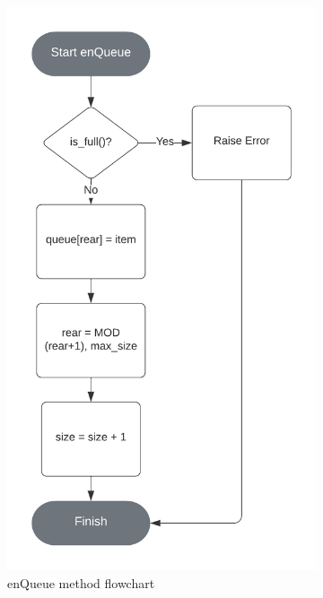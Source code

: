 \documentclass{article}
\begin{document}
\begin{figure}[ht]
    \centering
    \begin{subfigure}{.5\textwidth}
        \centering
        \includegraphics[width=.8\linewidth]{enQueue-circular-queue-flowchart}
        \caption{enQueue method flowchart}
    \end{subfigure}%
    \begin{subfigure}{.5\textwidth}
      \centering

\end{subfigure}
\end{figure}
\end{document}
